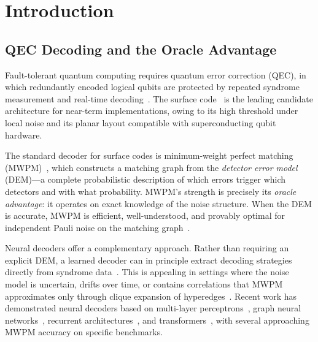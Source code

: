 
\section{Introduction}

\subsection{QEC Decoding and the Oracle Advantage}

Fault-tolerant quantum computing requires quantum error correction (QEC), in which redundantly encoded logical qubits are protected by repeated syndrome measurement and real-time decoding~\cite{PLACEHOLDER_qec_review}. The surface code~\cite{PLACEHOLDER_surface_code} is the leading candidate architecture for near-term implementations, owing to its high threshold under local noise and its planar layout compatible with superconducting qubit hardware.

The standard decoder for surface codes is minimum-weight perfect matching (MWPM)~\cite{PLACEHOLDER_mwpm}, which constructs a matching graph from the \emph{detector error model} (DEM)---a complete probabilistic description of which errors trigger which detectors and with what probability. MWPM's strength is precisely its \emph{oracle advantage}: it operates on exact knowledge of the noise structure. When the DEM is accurate, MWPM is efficient, well-understood, and provably optimal for independent Pauli noise on the matching graph~\cite{PLACEHOLDER_mwpm_optimality}.

Neural decoders offer a complementary approach. Rather than requiring an explicit DEM, a learned decoder can in principle extract decoding strategies directly from syndrome data~\cite{PLACEHOLDER_nn_decoder_survey}. This is appealing in settings where the noise model is uncertain, drifts over time, or contains correlations that MWPM approximates only through clique expansion of hyperedges~\cite{PLACEHOLDER_correlated_noise}. Recent work has demonstrated neural decoders based on multi-layer perceptrons~\cite{PLACEHOLDER_mlp_decoder}, graph neural networks~\cite{PLACEHOLDER_gnn_decoder}, recurrent architectures~\cite{PLACEHOLDER_rnn_decoder}, and transformers~\cite{PLACEHOLDER_transformer_decoder}, with several approaching MWPM accuracy on specific benchmarks.

